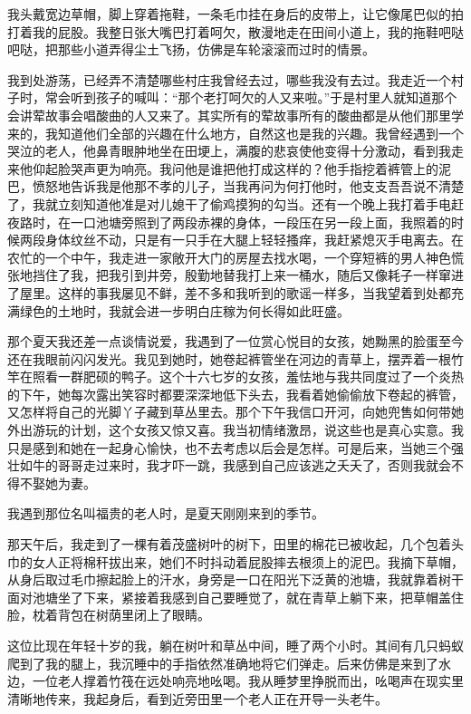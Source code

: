 \documentclass[12pt,UTF8]{ctexbook}
\begin{document}
我头戴宽边草帽，脚上穿着拖鞋，一条毛巾挂在身后的皮带上，让它像尾巴似的拍打着我的屁股。我整日张大嘴巴打着呵欠，散漫地走在田间小道上，我的拖鞋吧哒吧哒，把那些小道弄得尘土飞扬，仿佛是车轮滚滚而过时的情景。

我到处游荡，已经弄不清楚哪些村庄我曾经去过，哪些我没有去过。我走近一个村子时，常会听到孩子的喊叫：“那个老打呵欠的人又来啦。”于是村里人就知道那个会讲荤故事会唱酸曲的人又来了。其实所有的荤故事所有的酸曲都是从他们那里学来的，我知道他们全部的兴趣在什么地方，自然这也是我的兴趣。我曾经遇到一个哭泣的老人，他鼻青眼肿地坐在田埂上，满腹的悲哀使他变得十分激动，看到我走来他仰起脸哭声更为响亮。我问他是谁把他打成这样的？他手指挖着裤管上的泥巴，愤怒地告诉我是他那不孝的儿子，当我再问为何打他时，他支支吾吾说不清楚了，我就立刻知道他准是对儿媳干了偷鸡摸狗的勾当。还有一个晚上我打着手电赶夜路时，在一口池塘旁照到了两段赤裸的身体，一段压在另一段上面，我照着的时候两段身体纹丝不动，只是有一只手在大腿上轻轻搔痒，我赶紧熄灭手电离去。在农忙的一个中午，我走进一家敞开大门的房屋去找水喝，一个穿短裤的男人神色慌张地挡住了我，把我引到井旁，殷勤地替我打上来一桶水，随后又像耗子一样窜进了屋里。这样的事我屡见不鲜，差不多和我听到的歌谣一样多，当我望着到处都充满绿色的土地时，我就会进一步明白庄稼为何长得如此旺盛。

那个夏天我还差一点谈情说爱，我遇到了一位赏心悦目的女孩，她黝黑的脸蛋至今还在我眼前闪闪发光。我见到她时，她卷起裤管坐在河边的青草上，摆弄着一根竹竿在照看一群肥硕的鸭子。这个十六七岁的女孩，羞怯地与我共同度过了一个炎热的下午，她每次露出笑容时都要深深地低下头去，我看着她偷偷放下卷起的裤管，又怎样将自己的光脚丫子藏到草丛里去。那个下午我信口开河，向她兜售如何带她外出游玩的计划，这个女孩又惊又喜。我当初情绪激昂，说这些也是真心实意。我只是感到和她在一起身心愉快，也不去考虑以后会是怎样。可是后来，当她三个强壮如牛的哥哥走过来时，我才吓一跳，我感到自己应该逃之夭夭了，否则我就会不得不娶她为妻。

我遇到那位名叫福贵的老人时，是夏天刚刚来到的季节。

那天午后，我走到了一棵有着茂盛树叶的树下，田里的棉花已被收起，几个包着头巾的女人正将棉秆拔出来，她们不时抖动着屁股摔去根须上的泥巴。我摘下草帽，从身后取过毛巾擦起脸上的汗水，身旁是一口在阳光下泛黄的池塘，我就靠着树干面对池塘坐了下来，紧接着我感到自己要睡觉了，就在青草上躺下来，把草帽盖住脸，枕着背包在树荫里闭上了眼睛。

这位比现在年轻十岁的我，躺在树叶和草丛中间，睡了两个小时。其间有几只蚂蚁爬到了我的腿上，我沉睡中的手指依然准确地将它们弹走。后来仿佛是来到了水边，一位老人撑着竹筏在远处响亮地吆喝。我从睡梦里挣脱而出，吆喝声在现实里清晰地传来，我起身后，看到近旁田里一个老人正在开导一头老牛。
\end{document}
